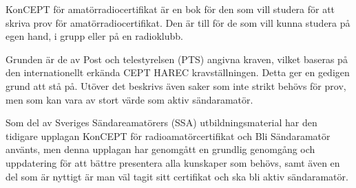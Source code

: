 \newpage
\AddToShipoutPicture*{\BackgroundPicLast}

\color{white}
KonCEPT för amatörradiocertifikat är en bok för den som vill studera för att
skriva prov för amatörradiocertifikat. Den är till för de som vill kunna studera
på egen hand, i grupp eller på en radioklubb.

Grunden är de av Post och telestyrelsen (PTS) angivna kraven, vilket baseras på
den internationellt erkända CEPT HAREC kravställningen. Detta ger en gedigen
grund att stå på. Utöver det beskrivs även saker som inte strikt behövs för
prov, men som kan vara av stort värde som aktiv sändaramatör.

Som del av Sveriges Sändareamatörers (SSA) utbildningsmaterial har den tidigare
upplagan KonCEPT för radioamatörcertifikat och Bli Sändaramatör använts, men
denna upplagan har genomgått en grundlig genomgång och uppdatering för att
bättre presentera alla kunskaper som behövs, samt även en del som är nyttigt
är man väl tagit sitt certifikat och ska bli aktiv sändaramatör.
